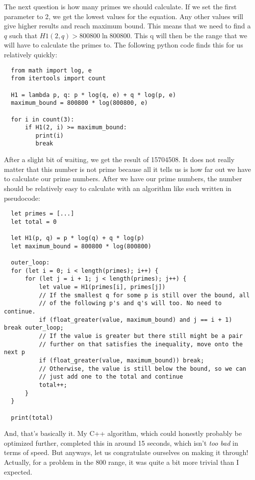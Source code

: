 \documentclass[13pt]{article}
\begin{document}
The next question is how many primes we should calculate. If we set the first parameter to 2, we get the lowest values for the equation. Any other values will give higher results and reach maximum bound. This means that we need to find a $q$ such that $H1(2, q) > 800800 \ln{800800}$. This q will then be the range that we will have to calculate the primes to. The following python code finds this for us relatively quickly:

\begin{verbatim}
  from math import log, e
  from itertools import count
  
  H1 = lambda p, q: p * log(q, e) + q * log(p, e)
  maximum_bound = 800800 * log(800800, e)
  
  for i in count(3):
      if H1(2, i) >= maximum_bound:
         print(i)
         break
\end{verbatim}

After a slight bit of waiting, we get the result of 15704508. It does not really matter that this number is not prime because all it tells us is how far out we have to calculate our prime numbers. After we have our prime numbers, the number should be relatively easy to calculate with an algorithm like such written in pseudocode:

\begin{verbatim}
  let primes = [...]
  let total = 0
  
  let H1(p, q) = p * log(q) + q * log(p)
  let maximum_bound = 800800 * log(800800)
  
  outer_loop:
  for (let i = 0; i < length(primes); i++) {
      for (let j = i + 1; j < length(primes); j++) {
          let value = H1(primes[i], primes[j])
          // If the smallest q for some p is still over the bound, all
          // of the following p's and q's will too. No need to continue.
          if (float_greater(value, maximum_bound) and j == i + 1) break outer_loop;
          // If the value is greater but there still might be a pair
          // further on that satisfies the inequality, move onto the next p
          if (float_greater(value, maximum_bound)) break;
          // Otherwise, the value is still below the bound, so we can
          // just add one to the total and continue
          total++;
      }
  }
  
  print(total)
\end{verbatim}

And, that's basically it. My C++ algorithm, which could honestly probably be optimized further, completed this in around 15 seconds, which isn't \textit{too bad} in terms of speed. But anyways, let us congratulate ourselves on making it through! Actually, for a problem in the 800 range, it was quite a bit more trivial than I expected.
\end{document}
